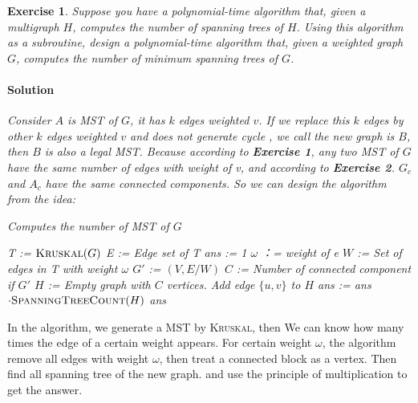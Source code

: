 \documentclass[12pt,a4]{article}
\newtheorem{exercise}[theorem]{Exercise}
\begin{document}
\begin{exercise}
  Suppose you have a polynomial-time algorithm that, given a multigraph $H$,
  computes the number of spanning trees of $H$.
  Using this algorithm as a subroutine, design a polynomial-time algorithm
  that, given a weighted graph $G$, computes the number of 
  minimum spanning trees of $G$.

  \paragraph{Solution}
    Consider $A$ is MST of $G$, it has $k$ edges weighted $v$. If we replace 
   this $k$ edges by other $k$ edges weighted $v$ and does not generate cycle 
   , we call the new graph is $B$, then $B$ is also a legal MST. Because
   according to \textbf{Exercise 1}, any two MST of $G$ 
   have the same number of edges with weight of v, and 
   according to \textbf{Exercise 2}. $G_c$ and $A_c$ have the same
   connected components. So we can design the algorithm from the idea:

   \begin{algorithm}
    \caption{Computes the number of MST of $G$}
    \begin{algorithmic}[1]
        \State T := $\textsc{Kruskal}(G)$
        \State E := Edge set of T
        \State ans := 1
            \State $\omega$ ：= weight of e
                \State $W$ := Set of edges in T with weight $\omega$        
                \State $G'$ := $(V, E / W)$
                \State $C$ := Number of connected component if $G'$
                \State $H$ := Empty graph with $C$ vertices.
                        \State Add edge $\{ u, v \}$ to $H$
                    \EndIf 
                \EndFor
                \State ans := ans $\cdot \textsc{SpanningTreeCount}(H)$
            \EndIf
        \EndFor
        \State \Return ans
    \EndProcedure
    \end{algorithmic}
\end{algorithm}
\end{exercise}

In the algorithm, we generate a MST by \textsc{Kruskal}, then We can know how many times the edge of a certain weight appears. For certain weight $\omega$, the algorithm remove all edges with weight $\omega$, then treat a connected block as a vertex. Then find all 
spanning tree of the new graph. and use the principle of multiplication to get the answer.
\end{document}
